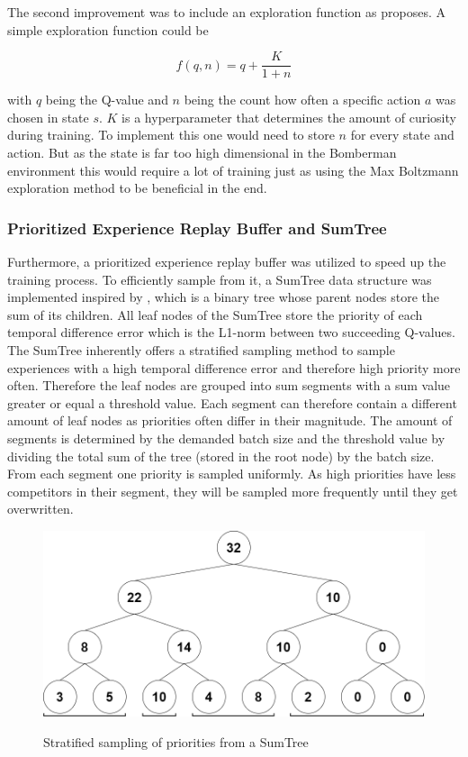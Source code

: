 The second improvement was to include an exploration function as \cite{Geron2018} proposes. A simple exploration function could be 

\begin{equation} \label{expfunc}
	f(q,n) = q + \frac{K}{1+n}
\end{equation}

with $q$ being the Q-value and $n$ being the count how often a specific action $a$ was chosen in state $s$. $K$ is a hyperparameter that determines the amount of curiosity during training. To implement this one would need to store $n$ for every state and action. But as the state is far too high dimensional in the Bomberman environment this would require a lot of training just as using the Max Boltzmann exploration method to be beneficial in the end. 

\subsubsection{Prioritized Experience Replay Buffer and SumTree}
\label{ch:approachBb}

Furthermore, a prioritized experience replay buffer was utilized to speed up the training process. To efficiently sample from it, a SumTree data structure was implemented inspired by \cite{Schaul2016}, which is a binary tree whose parent nodes store the sum of its children. All leaf nodes of the SumTree store the priority of each temporal difference error which is the L1-norm between two succeeding Q-values. The SumTree inherently offers a stratified sampling method to sample experiences with a high temporal difference error and therefore high priority more often. Therefore the leaf nodes are grouped into sum segments with a sum value greater or equal a threshold value. Each segment can therefore contain a different amount of leaf nodes as priorities often differ in their magnitude. The amount of segments is determined by the demanded batch size and the threshold value by dividing the total sum of the tree (stored in the root node) by the batch size. From each segment one priority is sampled uniformly. As high priorities have less competitors in their segment, they will be sampled more frequently until they get overwritten.  

\begin{figure}[ht]
	\centering
	\includegraphics[width=0.6\linewidth]{figures/sumtree.PNG}
	\caption{Stratified sampling of priorities from a SumTree}
	\label{fig:sumtree}
	\cite{own representation}
\end{figure}


